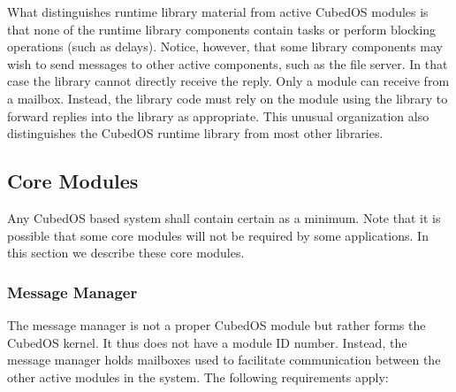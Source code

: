 What distinguishes runtime library material from active CubedOS modules is that none of the
runtime library components contain tasks or perform blocking operations (such as delays).
Notice, however, that some library components may wish to send messages to other active
components, such as the file server. In that case the library cannot directly receive the reply.
Only a module can receive from a mailbox. Instead, the library code must rely on the module
using the library to forward replies into the library as appropriate. This unusual organization
also distinguishes the CubedOS runtime library from most other libraries. 

\subsection{Core Modules}
\label{sec:requirements-core-modules}

Any CubedOS based system shall contain certain  as a minimum. Note that it
is possible that some core modules will not be required by some applications. In this section we
describe these core modules.

\subsubsection{Message Manager}
\label{sec:requirements-message-manager}

The message manager is not a proper CubedOS module but rather forms the CubedOS kernel. It thus
does not have a module ID number. Instead, the message manager holds mailboxes used to facilitate
communication between the other active modules in the system. The following requirements apply:

